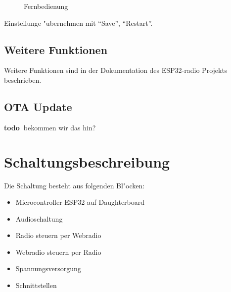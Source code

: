 \documentclass[ngerman,11pt,parskip=half] {scrartcl}
\newcommand {\todo} {\textbf{\color{red} todo\ }}
\begin{document}
\begin{figure}[H]
\centering
{}
\caption{Fernbedienung} \label{fig:1}
\end{figure}

Einstellunge "ubernehmen mit "`Save"', "`Restart"'.

\subsection{Weitere Funktionen}

Weitere Funktionen sind in der Dokumentation des ESP32-radio Projekts beschrieben.

\subsection{OTA Update}

\todo bekommen wir das hin?

\section{Schaltungsbeschreibung} \label{sec:schaltung}

Die Schaltung besteht aus folgenden Bl"ocken:
\begin{itemize}
\item Microcontroller ESP32 auf Daughterboard
\item Audioschaltung
\item Radio steuern per Webradio
\item Webradio steuern per Radio
\item Spannungsversorgung
\item Schnittstellen
\end{itemize}
\end{document}
